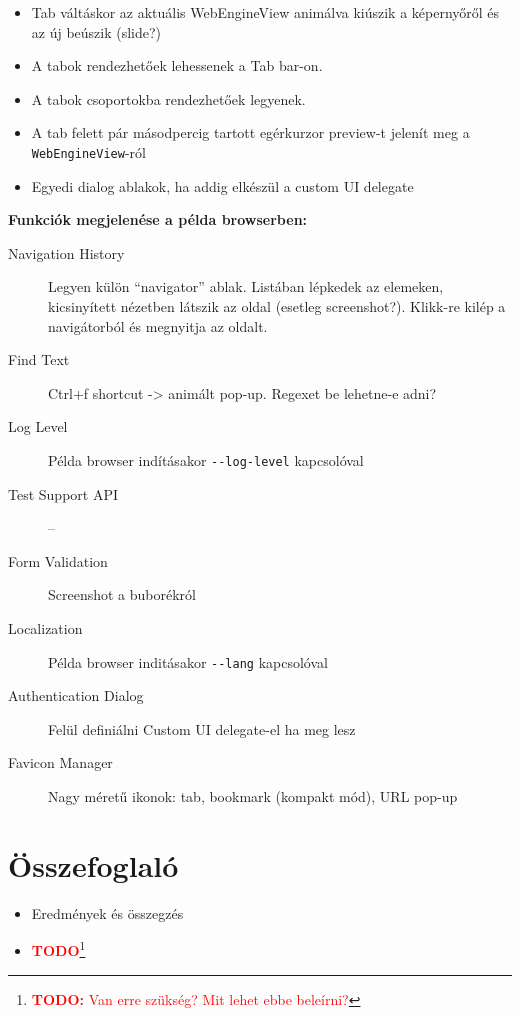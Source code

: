 \documentclass[12pt]{report}
\newcommand{\todo}[1]{%
    \textcolor{red}{\textbf{TODO}}\footnote{\textcolor{red}{\textbf{TODO:} #1}}
}
\begin{document}
\begin{itemize}
    \item Tab váltáskor az aktuális WebEngineView animálva kiúszik a képernyőről és az
        új beúszik (slide?)
    \item A tabok rendezhetőek lehessenek a Tab bar-on.
    \item A tabok csoportokba rendezhetőek legyenek.
    \item A tab felett pár másodpercig tartott egérkurzor preview-t jelenít meg a \\
        \texttt{WebEngineView}-ról
    \item Egyedi dialog ablakok, ha addig elkészül a custom UI delegate
\end{itemize}

\noindent
\textbf{Funkciók megjelenése a példa browserben:}
\begin{description}
    \item[Navigation History] Legyen külön ``navigator'' ablak. Listában lépkedek az
        elemeken, kicsinyített nézetben látszik az oldal (esetleg screenshot?). Klikk-re
        kilép a navigátorból és megnyitja az oldalt.
    \item[Find Text] Ctrl+f shortcut -> animált pop-up. Regexet be lehetne-e adni?
    \item[Log Level] Példa browser indításakor \texttt{-{}-log-level} kapcsolóval
    \item[Test Support API] --
    \item[Form Validation] Screenshot a buborékról
    \item[Localization] Példa browser inditásakor \texttt{-{}-lang} kapcsolóval
    \item[Authentication Dialog] Felül definiálni Custom UI delegate-el ha meg lesz
    \item[Favicon Manager] Nagy méretű ikonok: tab, bookmark (kompakt mód), URL pop-up
\end{description}

\chapter{Összefoglaló}
\begin{itemize}
    \item Eredmények és összegzés
    \item \todo{Van erre szükség? Mit lehet ebbe beleírni?}
\end{itemize}


\end{document}
